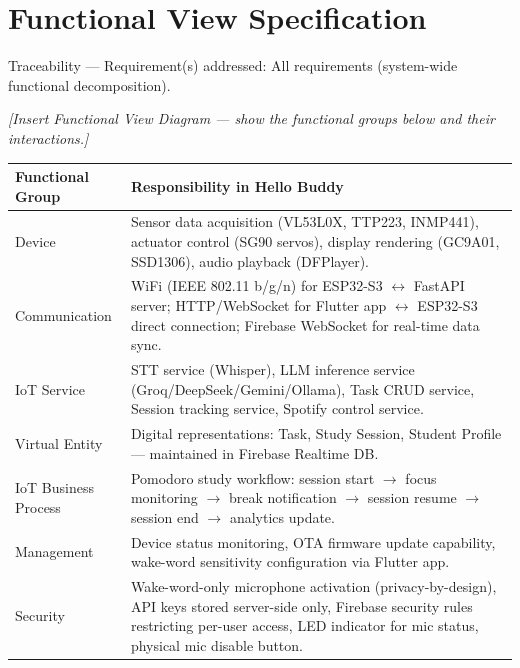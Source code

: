 \documentclass[12pt,a4paper]{article}
\begin{document}
\section{Functional View Specification}

\begin{tracebox}
Traceability --- Requirement(s) addressed: All requirements (system-wide
functional decomposition).
\end{tracebox}

\vspace{0.3cm}

\begin{center}
\textit{[Insert Functional View Diagram --- show the functional groups
below and their interactions.]}
\end{center}
\label{fig:funcview}

\begin{center}
\label{tab:funcview}
\scriptsize
\begin{tabular}{|L{0.20\textwidth}|L{0.68\textwidth}|}
\hline
\textbf{Functional Group} & \textbf{Responsibility in Hello Buddy} \\ \hline
Device & Sensor data acquisition (VL53L0X, TTP223, INMP441), actuator
         control (SG90 servos), display rendering (GC9A01, SSD1306),
         audio playback (DFPlayer). \\ \hline
Communication & WiFi (IEEE 802.11 b/g/n) for ESP32-S3 $\leftrightarrow$
                FastAPI server; HTTP/WebSocket for Flutter app
                $\leftrightarrow$ ESP32-S3 direct connection; Firebase
                WebSocket for real-time data sync. \\ \hline
IoT Service & STT service (Whisper), LLM inference service
              (Groq/DeepSeek/Gemini/Ollama), Task CRUD service,
              Session tracking service, Spotify control service. \\ \hline
Virtual Entity & Digital representations: Task, Study Session, Student
                 Profile --- maintained in Firebase Realtime DB. \\ \hline
IoT Business Process & Pomodoro study workflow: session start
                       $\rightarrow$ focus monitoring $\rightarrow$
                       break notification $\rightarrow$ session resume
                       $\rightarrow$ session end $\rightarrow$
                       analytics update. \\ \hline
Management & Device status monitoring, OTA firmware update capability,
             wake-word sensitivity configuration via Flutter app. \\ \hline
Security & Wake-word-only microphone activation (privacy-by-design),
           API keys stored server-side only, Firebase security rules
           restricting per-user access, LED indicator for mic status,
           physical mic disable button. \\ \hline
\end{tabular}
\end{center}
\end{document}
